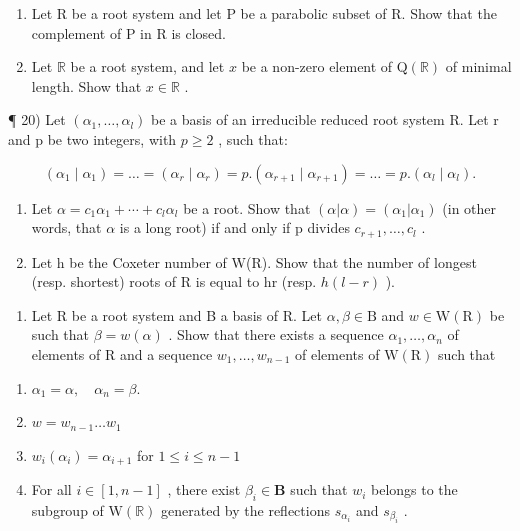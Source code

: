 \begin{enumerate}
\def\labelenumi{\arabic{enumi})}
\setcounter{enumi}{17}
\item
  Let R be a root system and let P be a parabolic subset of R. Show that the complement of P in R is closed.
\item
  Let \(\mathbb{R}\) be a root system, and let \(x\) be a non-zero element of \(\mathrm{Q}(\mathbb{R})\) of minimal length. Show that \(x \in \mathbb{R}\) .
\end{enumerate}

¶ 20) Let \((\alpha_{1},\ldots,\alpha_{l})\) be a basis of an irreducible reduced root system R. Let r and p be two integers, with \(p\geqslant2\) , such that:

\[
\left(\alpha_ {1} \mid \alpha_ {1}\right) = \dots = \left(\alpha_ {r} \mid \alpha_ {r}\right) = p. \left(\alpha_ {r + 1} \mid \alpha_ {r + 1}\right) = \dots = p. \left(\alpha_ {l} \mid \alpha_ {l}\right).
\]

\begin{enumerate}
\def\labelenumi{\alph{enumi})}
\item
  Let \(\alpha = c_{1}\alpha_{1} + \cdots + c_{l}\alpha_{l}\) be a root. Show that \((\alpha|\alpha) = (\alpha_{1}|\alpha_{1})\) (in other words, that \(\alpha\) is a long root) if and only if p divides \(c_{r+1},\ldots,c_{l}\) .
\item
  Let h be the Coxeter number of W(R). Show that the number of longest (resp. shortest) roots of R is equal to hr (resp. \(h(l - r)\) ).
\end{enumerate}

\begin{enumerate}
\def\labelenumi{\arabic{enumi})}
\setcounter{enumi}{20}
\tightlist
\item
  Let R be a root system and B a basis of R. Let \(\alpha, \beta \in \mathrm{B}\) and \(w \in \mathrm{W}(\mathrm{R})\) be such that \(\beta = w(\alpha)\) . Show that there exists a sequence \(\alpha_1, \ldots, \alpha_n\) of elements of R and a sequence \(w_1, \ldots, w_{n-1}\) of elements of \(\mathrm{W}(\mathrm{R})\) such that
\end{enumerate}

\begin{enumerate}
\def\labelenumi{(\roman{enumi})}
\item
  \(\alpha_{1} = \alpha, \quad \alpha_{n} = \beta.\)
\item
  \(w = w_{n - 1}\dots w_1\)
\item
  \(w_{i}(\alpha_{i}) = \alpha_{i + 1}\) for \(1\leqslant i\leqslant n - 1\)
\item
  For all \(i \in [1, n - 1]\) , there exist \(\beta_i \in \mathbf{B}\) such that \(w_i\) belongs to the subgroup of \(\mathrm{W}(\mathbb{R})\) generated by the reflections \(s_{\alpha_i}\) and \(s_{\beta_i}\) .
\end{enumerate}

